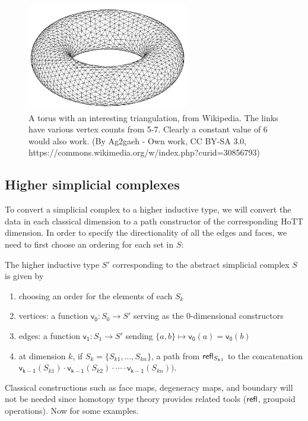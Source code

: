 \begin{figure}[htbp]
\centering
\includegraphics[width=200pt]{Torus-triang.png}
\caption{A torus with an interesting triangulation, from Wikipedia. The links have various vertex counts from 5-7. Clearly a constant value of 6 would also work. (By Ag2gaeh - Own work, CC BY-SA 3.0, https://commons.wikimedia.org/w/index.php?curid=30856793)}
\label{fig:torus_wiki_triangulation}
\end{figure}

\subsection{Higher simplicial complexes}

To convert a simplicial complex to a higher inductive type, we will convert the data in each classical dimension to a path constructor of the corresponding HoTT dimension. In order to specify the directionality of all the edges and faces, we need to first choose an ordering for each set in \( S \):

\begin{mydef}
The higher inductive type \( S' \) corresponding to the abstract simplicial complex \( S \) is given by
\begin{enumerate}
\item choosing an order for the elements of each \( S_k \)
\item vertices: a function \( \mathsf{v_0}:S_0\to S' \) serving as the 0-dimensional constructors
\item edges: a function \( \mathsf{v_1}:S_1\to S' \) sending \( \{a, b\}\mapsto \mathsf{v_0}(a)=\mathsf{v_0}(b) \)
\item at dimension \( k \), if \( S_k=\{S_{k1},\ldots,S_{kn}\}\), a path from \( \mathsf{refl}_{S_{k1}} \) to the concatenation \( \mathsf{v_{k-1}}(S_{k1})\cdot\mathsf{v_{k-1}}(S_{k2})\cdot\cdots\cdot\mathsf{v_{k-1}}(S_{kn})) \).
\end{enumerate}
\end{mydef}

Classical constructions such as face maps, degeneracy maps, and boundary will not be needed since homotopy type theory provides related tools (\( \mathsf{refl} \), groupoid operations). Now for some examples.

